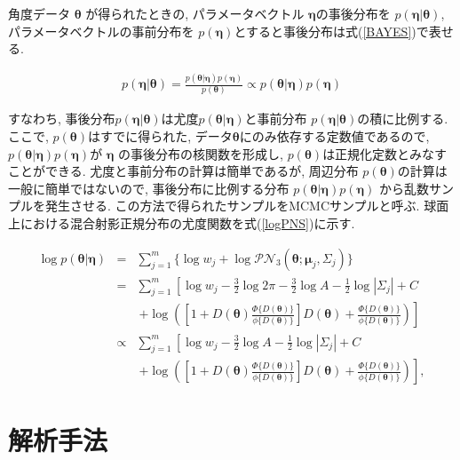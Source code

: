 \documentclass[a4j,12pt]{jarticle}
\begin{document}
角度データ $\bm \theta$ が得られたときの, パラメータベクトル $\bm \eta$の事後分布を $p(\bm \eta| \bm \theta)$, パラメータベクトルの事前分布を $p(\bm \eta)$とすると事後分布は式(\ref{BAYES})で表せる. 

\begin{eqnarray}
\label{BAYES}
p(\bm \eta | \bm \theta) = \frac{p(\bm \theta | \bm \eta) p(\bm \eta)}{p(\bm \theta)} \propto p(\bm \theta | \bm \eta) p(\bm \eta)
\end{eqnarray}

\noindent
すなわち, 事後分布$p(\bm \eta | \bm \theta)$は尤度$p(\bm \theta | \bm \eta)$と事前分布 $p(\bm \eta| \bm \theta)$の積に比例する. ここで, $p(\bm \theta)$はすでに得られた, データ$\bm \theta$にのみ依存する定数値であるので, $p(\bm \theta | \bm \eta) p(\bm \eta)$が $\bm \eta$  の事後分布の核関数を形成し, $p(\bm \theta)$は正規化定数とみなすことができる. 尤度と事前分布の計算は簡単であるが, 周辺分布 $p(\bm \theta)$の計算は一般に簡単ではないので, 事後分布に比例する分布 $p(\bm \theta | \bm \eta) p(\bm \eta)$ から乱数サンプルを発生させる. この方法で得られたサンプルをMCMCサンプルと呼ぶ. 球面上における混合射影正規分布の尤度関数を式(\ref{logPNS})に示す. 

\begin{eqnarray}
\label{logPNS}
\log p(\bm \theta | \bm \eta) &=& \sum^m_{j=1} \{\log w_j + \log \mathcal{PN}_3(\bm \theta;\bm \mu_j, \Sigma_j)\} \nonumber \\
&=& \sum^m_{j=1} \left[ \log w_j - \frac{3}{2} \log 2\pi - \frac{3}{2} \log A - \frac{1}{2} \log |\Sigma_j| + C \right. \nonumber \\
&&\  \left. + \log \left( \left[1 + D(\bm \theta) \frac{\Phi \{D(\bm \theta)\}}{\phi \{D(\bm \theta)\}} \right] D(\bm \theta) + \frac{\Phi \{D(\bm \theta)\}}{\phi \{D(\bm \theta)\}} \right)\right] \nonumber \\
&\propto& \sum^m_{j=1} \left[ \log w_j - \frac{3}{2} \log A - \frac{1}{2} \log |\Sigma_j| + C \right. \nonumber \\
&&\ \left. + \log \left( \left[1 + D(\bm \theta) \frac{\Phi \{D(\bm \theta)\}}{\phi \{D(\bm \theta)\}} \right] D(\bm \theta) + \frac{\Phi \{D(\bm \theta)\}}{\phi \{D(\bm \theta)\}} \right) \right], 
\end{eqnarray}


\section{解析手法}
\end{document}
